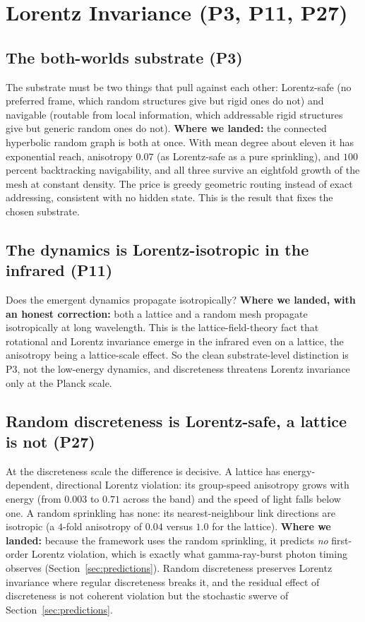 \section{Lorentz Invariance (P3, P11, P27)}
\label{sec:lorentz}

\subsection{The both-worlds substrate (P3)}

The substrate must be two things that pull against each other: Lorentz-safe (no
preferred frame, which random structures give but rigid ones do not) and navigable
(routable from local information, which addressable rigid structures give but generic
random ones do not). \textbf{Where we landed:} the connected hyperbolic random graph is
both at once. With mean degree about eleven it has exponential reach, anisotropy
$0.07$ (as Lorentz-safe as a pure sprinkling), and $100$ percent backtracking
navigability, and all three survive an eightfold growth of the mesh at constant
density. The price is greedy geometric routing instead of exact addressing, consistent
with no hidden state. This is the result that fixes the chosen substrate.

\subsection{The dynamics is Lorentz-isotropic in the infrared (P11)}

Does the emergent dynamics propagate isotropically? \textbf{Where we landed, with an
honest correction:} both a lattice and a random mesh propagate isotropically at long
wavelength. This is the lattice-field-theory fact that rotational and Lorentz invariance
emerge in the infrared even on a lattice, the anisotropy being a lattice-scale effect.
So the clean substrate-level distinction is P3, not the low-energy dynamics, and
discreteness threatens Lorentz invariance only at the Planck scale.

\subsection{Random discreteness is Lorentz-safe, a lattice is not (P27)}

At the discreteness scale the difference is decisive. A lattice has energy-dependent,
directional Lorentz violation: its group-speed anisotropy grows with energy (from
$0.003$ to $0.71$ across the band) and the speed of light falls below one. A random
sprinkling has none: its nearest-neighbour link directions are isotropic (a $4$-fold
anisotropy of $0.04$ versus $1.0$ for the lattice). \textbf{Where we landed:} because
the framework uses the random sprinkling, it predicts \emph{no} first-order Lorentz
violation, which is exactly what gamma-ray-burst photon timing observes
(Section~\ref{sec:predictions}). Random discreteness preserves Lorentz invariance where
regular discreteness breaks it, and the residual effect of discreteness is not coherent
violation but the stochastic swerve of Section~\ref{sec:predictions}.

